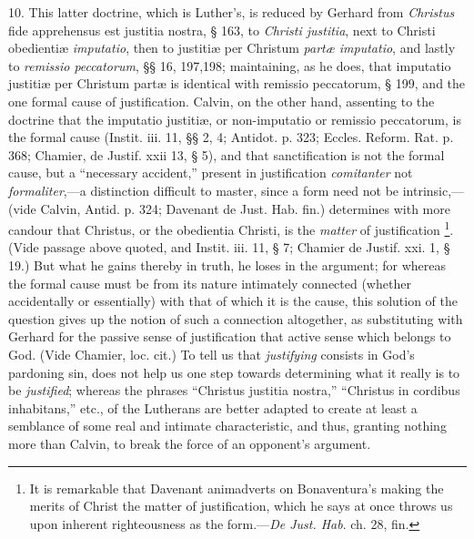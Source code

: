 10. This latter doctrine, which is Luther's, is reduced by Gerhard
from \emph{Christus} fide apprehensus est justitia nostra, § 163, to \emph{Christi
justitia}, next to Christi obedientiæ \emph{imputatio}, then to
justitiæ per Christum \emph{partæ imputatio}, and lastly to \emph{remissio
peccatorum}, §§ 16, 197,198; maintaining, as he does, that
imputatio justitiæ per Christum partæ is identical with remissio
peccatorum, § 199, and the one formal cause of justification. Calvin,
on the other hand, assenting to the doctrine that the imputatio
justitiæ, or non-imputatio or remissio peccatorum, is the formal
cause (Instit. iii. 11, §§ 2, 4; Antidot. p. 323; Eccles. Reform.
Rat. p. 368; Chamier, de Justif. xxii 13, § 5), and that
sanctification is not the formal cause, but a ``necessary
accident,'' present in justification \emph{comitanter} not \emph{formaliter},—a
distinction difficult to master, since a form need not be intrinsic,—(vide
Calvin, Antid. p. 324; Davenant de Just. Hab. fin.) determines with
more candour that Christus, or the obedientia Christi, is the \emph{matter}
of justification \footnote{It is
remarkable that Davenant animadverts on Bonaventura's making the
merits of Christ the matter of justification, which he says at once
throws us upon inherent righteousness as the form.—\emph{De Just. Hab}.
ch. 28, fin.}.
(Vide passage above quoted, and Instit. iii. 11, § 7; Chamier de
Justif. xxi. 1, § 19.) But what he gains thereby in truth, he loses
in the argument; for whereas the formal cause must be from its nature
intimately connected (whether accidentally or essentially) with that
of which it is the cause, this solution of the question gives up the
notion of such a connection altogether, as substituting with Gerhard
for the passive sense of justification that active sense which belongs
to God. (Vide Chamier, loc. cit.) To tell us that \emph{justifying}
consists in God's pardoning sin, does not help us one step towards
determining what it really is to be \emph{justified}; whereas the
phrases ``Christus justitia nostra,'' ``Christus in
cordibus inhabitans,'' etc., of the Lutherans are better adapted
to create at least a semblance of some real and intimate
characteristic, and thus, granting nothing more than Calvin, to break
the force of an opponent's argument.

